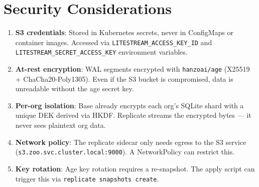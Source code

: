 \section{Security Considerations}


\begin{enumerate}
\item \textbf{S3 credentials}: Stored in Kubernetes secrets,
  never in ConfigMaps or container images.  Accessed via
  \texttt{LITESTREAM\_ACCESS\_KEY\_ID} and
  \texttt{LITESTREAM\_SECRET\_ACCESS\_KEY} environment variables.

\item \textbf{At-rest encryption}: WAL segments encrypted with
  \texttt{hanzoai/age} (X25519 + ChaCha20-Poly1305).  Even if
  the S3 bucket is compromised, data is unreadable without the
  age secret key.

\item \textbf{Per-org isolation}: Base already encrypts each
  org's SQLite shard with a unique DEK derived via HKDF.
  Replicate streams the encrypted bytes --- it never sees
  plaintext org data.

\item \textbf{Network policy}: The replicate sidecar only needs
  egress to the S3 service (\texttt{s3.zoo.svc.cluster.local:9000}).
  A NetworkPolicy can restrict this.

\item \textbf{Key rotation}: Age key rotation requires a
  re-snapshot.  The apply script can trigger this via
  \texttt{replicate snapshots create}.
\end{enumerate}

